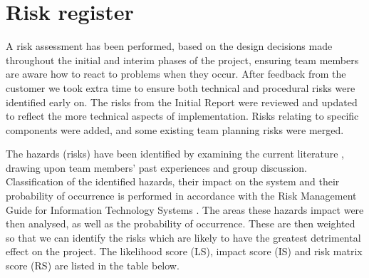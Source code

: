 \section{Risk register}
\label{sec:riskregister}

A risk assessment has been performed, based on the design decisions made throughout the initial and interim phases of the project, ensuring team members are aware how to react to problems when they occur. After feedback from the customer we took extra time to ensure both technical and procedural risks were identified early on. The risks from the Initial Report were reviewed and updated to reflect the more technical aspects of implementation. Risks relating to specific components were added, and some existing team planning risks were merged.

The hazards (risks) have been identified by examining the 
current literature \cite{boehm1991software,jones1998minimizing}, drawing upon team members' past experiences and group discussion. Classification of the identified hazards, their impact on the system and their probability of occurrence is performed in accordance with the Risk Management Guide for Information Technology Systems \cite{stoneburner2002risk}. The areas these hazards impact were then analysed, as well as the probability of occurrence. These are then weighted so that we can identify the risks which are likely to have the greatest detrimental effect on the project. The likelihood score (LS), impact score (IS) and risk matrix score (RS) are listed in the table below.

